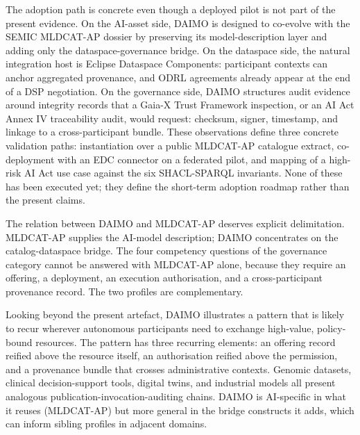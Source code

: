 \documentclass[Afour,sagev,times]{sagej}
\begin{document}
The adoption path is concrete even though a deployed pilot is not part of the present evidence. On the AI-asset side, DAIMO is designed to co-evolve with the SEMIC MLDCAT-AP dossier by preserving its model-description layer and adding only the dataspace-governance bridge. On the dataspace side, the natural integration host is Eclipse Dataspace Components: participant contexts can anchor aggregated provenance, and ODRL agreements already appear at the end of a DSP negotiation. On the governance side, DAIMO structures audit evidence around integrity records that a Gaia-X Trust Framework inspection, or an AI Act Annex IV traceability audit, would request: checksum, signer, timestamp, and linkage to a cross-participant bundle. These observations define three concrete validation paths: instantiation over a public MLDCAT-AP catalogue extract, co-deployment with an EDC connector on a federated pilot, and mapping of a high-risk AI Act use case against the six SHACL-SPARQL invariants. None of these has been executed yet; they define the short-term adoption roadmap rather than the present claims.

The relation between DAIMO and MLDCAT-AP deserves explicit delimitation. MLDCAT-AP supplies the AI-model description; DAIMO concentrates on the catalog-dataspace bridge. The four competency questions of the governance category cannot be answered with MLDCAT-AP alone, because they require an offering, a deployment, an execution authorisation, and a cross-participant provenance record. The two profiles are complementary.

Looking beyond the present artefact, DAIMO illustrates a pattern that is likely to recur wherever autonomous participants need to exchange high-value, policy-bound resources. The pattern has three recurring elements: an offering record reified above the resource itself, an authorisation reified above the permission, and a provenance bundle that crosses administrative contexts. Genomic datasets, clinical decision-support tools, digital twins, and industrial models all present analogous publication-invocation-auditing chains. DAIMO is AI-specific in what it reuses (MLDCAT-AP) but more general in the bridge constructs it adds, which can inform sibling profiles in adjacent domains.
\end{document}
